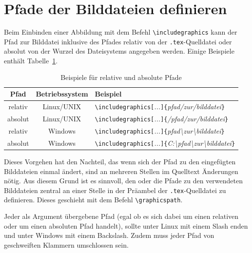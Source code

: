 \documentclass[a4paper,10pt,twoside]{scrbook}
\begin{document}
{\section{Pfade der Bilddateien definieren}

Beim Einbinden einer Abbildung mit dem Befehl \verb!\includegraphics! kann der Pfad zur Bilddatei inklusive des Pfades relativ von der \verb!.tex!-Quelldatei oder absolut von der Wurzel des Dateisystems angegeben werden. Einige Beispiele enthält Tabelle~\ref{Tabelle_Relative_und_Absolute_Pfade}.



\begin{table}[h!tb]
\centering
\caption{Beispiele für relative und absolute Pfade}
\label{Tabelle_Relative_und_Absolute_Pfade}
\begin{tabular}{ccl}
\hline
\textbf{Pfad} & \textbf{Betriebssystem} & \textbf{Beispiel} \\
\hline
relativ & Linux/UNIX   & \texttt{\textbackslash includegraphics[}\textsl{...}\texttt{]\{}\textsl{pfad/zur/bilddatei}\texttt{\}} \\
absolut & Linux/UNIX   & \texttt{\textbackslash includegraphics[}\textsl{...}\texttt{]\{}\textsl{/pfad/zur/bilddatei}\texttt{\}} \\
relativ & Windows & \texttt{\textbackslash includegraphics[}\textsl{...}\texttt{]\{}\textsl{pfad\textbackslash zur\textbackslash bilddatei}\texttt{\}}  \\
absolut & Windows & \texttt{\textbackslash includegraphics[}\textsl{...}\texttt{]\{}\textsl{C:\textbackslash pfad\textbackslash zur\textbackslash bilddatei}\texttt{\}}  \\
\hline
\end{tabular}
\end{table}


Dieses Vorgehen hat den Nachteil, das wenn sich der Pfad zu den eingefügten Bilddateien  einmal ändert, sind an mehreren Stellen im Quelltext Änderungen nötig. Aus diesem Grund ist es sinnvoll, den oder die Pfade zu den verwendeten Bilddateien zentral an einer Stelle in der Präambel der \verb!.tex!-Quelldatei zu definieren. Dieses geschieht mit dem Befehl \verb!\graphicspath!. 



Jeder als Argument übergebene Pfad (egal ob es sich dabei um einen relativen oder um einen absoluten Pfad handelt), sollte unter Linux mit einem Slash enden und unter Windows mit einem Backslash. Zudem muss jeder Pfad von geschweiften Klammern umschlossen sein.




}
\end{document}
